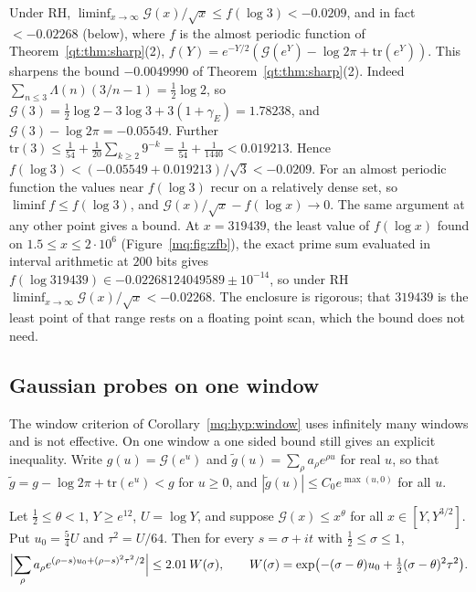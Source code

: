 \begin{remark}\label{mq:rem:liminf3}
Under RH, $\liminf_{x\to\infty}\mathcal G(x)/\sqrt x\le f(\log3)<-0.0209$, and in fact $<-0.02268$ (below), where $f$ is the almost periodic function of Theorem~\ref{qt:thm:sharp}(2), $f(Y)=e^{-Y/2}(\mathcal G(e^Y)-\log2\pi+\mathrm{tr}(e^Y))$. This sharpens the bound $-0.0049990$ of Theorem~\ref{qt:thm:sharp}(2). Indeed $\sum_{n\le3}\Lambda(n)(3/n-1)=\tfrac12\log2$, so $\mathcal G(3)=\tfrac12\log2-3\log3+3(1+\gamma_E)=1.78238$, and $\mathcal G(3)-\log2\pi=-0.05549$. Further $\mathrm{tr}(3)\le\frac1{54}+\frac1{20}\sum_{k\ge2}9^{-k}=\frac1{54}+\frac1{1440}<0.019213$. Hence $f(\log3)<(-0.05549+0.019213)/\sqrt3<-0.0209$. For an almost periodic function the values near $f(\log3)$ recur on a relatively dense set, so $\liminf f\le f(\log3)$, and $\mathcal G(x)/\sqrt x-f(\log x)\to0$. The same argument at any other point gives a bound. At $x=319439$, the least value of $f(\log x)$ found on $1.5\le x\le2\cdot10^6$ (Figure~\ref{mq:fig:zfb}), the exact prime sum evaluated in interval arithmetic at $200$ bits gives $f(\log319439)\in-0.02268124049589\pm10^{-14}$, so under RH $\liminf_{x\to\infty}\mathcal G(x)/\sqrt x<-0.02268$. The enclosure is rigorous; that $319439$ is the least point of that range rests on a floating point scan, which the bound does not need.
\end{remark}

\subsection{Gaussian probes on one window}

The window criterion of Corollary~\ref{mq:hyp:window} uses infinitely many windows and is not effective. On one window a one sided bound still gives an explicit inequality. Write $g(u)=\mathcal G(e^u)$ and $\tilde g(u)=\sum_\rho a_\rho e^{\rho u}$ for real $u$, so that $\tilde g=g-\log2\pi+\mathrm{tr}(e^u)<g$ for $u\ge0$, and $|\tilde g(u)|\le C_0e^{\max(u,0)}$ for all $u$.

\begin{theorem}\label{mq:thm:gauss}
Let $\frac12\le\theta<1$, $Y\ge e^{12}$, $U=\log Y$, and suppose $\mathcal G(x)\le x^\theta$ for all $x\in[Y,Y^{3/2}]$. Put $u_0=\frac54U$ and $\tau^2=U/64$. Then for every $s=\sigma+it$ with $\frac12\le\sigma\le1$,
\[
\Bigl|\sum_\rho a_\rho e^{(\rho-s)u_0+(\rho-s)^2\tau^2/2}\Bigr|\le2.01\,W(\sigma),\qquad W(\sigma)=\exp\bigl(-(\sigma-\theta)u_0+\tfrac12(\sigma-\theta)^2\tau^2\bigr).
\]
\end{theorem}


